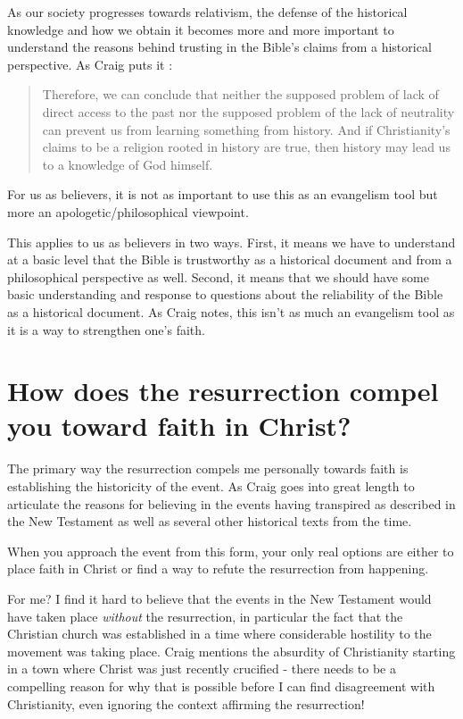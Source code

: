\documentclass[12pt]{turabian-researchpaper}
\begin{document}
As our society progresses towards relativism, the defense of the historical knowledge and how we obtain it becomes more and more important to understand the reasons behind trusting in the Bible's claims from a historical perspective. As Craig puts it \autocite[pg.240]{craig2008reasonable}:

\begin{quote}
Therefore, we can conclude that neither the supposed problem of lack of direct access to the past nor the supposed problem of the lack of neutrality can prevent us from learning something from history. And if Christianity's  claims to be a religion rooted in history are true, then history may lead us to a knowledge of God himself.
\end{quote}

For us as believers, it is not as important to use this as an evangelism tool but more an apologetic/philosophical viewpoint.

This applies to us as believers in two ways. First, it means we have to understand at a basic level that the Bible is trustworthy as a historical document and from a philosophical perspective as well. Second, it means that we should have some basic understanding and response to questions about the reliability of the Bible as a historical document. As Craig notes, this isn't as much an evangelism tool as it is a way to strengthen one's faith.

\section{How does the resurrection compel you toward faith in Christ?}

The primary way the resurrection compels me personally towards faith is establishing the historicity of the event. As Craig goes into great length to articulate the reasons for believing in the events having transpired as described in the New Testament as well as several other historical texts from the time.

When you approach the event from this form, your only real options are either to place faith in Christ or find a way to refute the resurrection from happening.

For me? I find it hard to believe that the events in the New Testament would have taken place \textit{without} the resurrection, in particular the fact that the Christian church was established in a time where considerable hostility to the movement was taking place. Craig mentions the absurdity of Christianity starting in a town where Christ was just recently crucified - there needs to be a compelling reason for why that is possible before I can find disagreement with Christianity, even ignoring the context affirming the resurrection!
\end{document}
